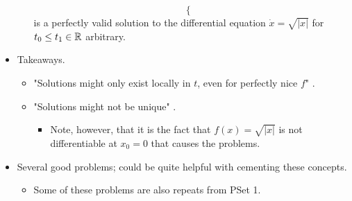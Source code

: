 \documentclass[../notes.tex]{subfiles}
\begin{document}
\begin{itemize}
\begin{itemize}
\begin{equation*}
\begin{cases}
            \end{cases}
        \end{equation*}
        is a perfectly valid solution to the differential equation $\dot{x}=\sqrt{|x|}$ for $t_0\leq t_1\in\mathbb{R}$ arbitrary.
    \end{itemize}
    \item Takeaways.
    \begin{itemize}
        \item "Solutions might only exist locally in $t$, even for perfectly nice $f$" \parencite[11]{bib:Teschl}.
        \item "Solutions might not be unique" \parencite[11]{bib:Teschl}.
        \begin{itemize}
            \item Note, however, that it is the fact that $f(x)=\sqrt{|x|}$ is not differentiable at $x_0=0$ that causes the problems.
        \end{itemize}
    \end{itemize}
    \item Several good problems; could be quite helpful with cementing these concepts.
    \begin{itemize}
        \item Some of these problems are also repeats from PSet 1.
    \end{itemize}
\end{itemize}
\end{document}
